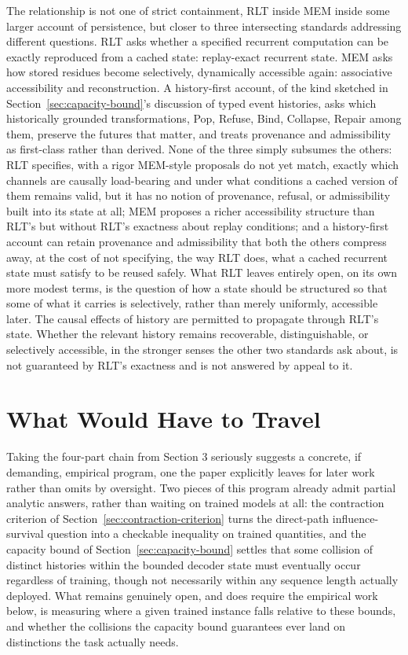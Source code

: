 \documentclass[11pt]{article}
\begin{document}
The relationship is not one of strict containment, RLT inside MEM inside some larger account of persistence, but closer to three intersecting standards addressing different questions. RLT asks whether a specified recurrent computation can be exactly reproduced from a cached state: replay-exact recurrent state. MEM asks how stored residues become selectively, dynamically accessible again: associative accessibility and reconstruction. A history-first account, of the kind sketched in Section~\ref{sec:capacity-bound}'s discussion of typed event histories, asks which historically grounded transformations, Pop, Refuse, Bind, Collapse, Repair among them, preserve the futures that matter, and treats provenance and admissibility as first-class rather than derived. None of the three simply subsumes the others: RLT specifies, with a rigor MEM-style proposals do not yet match, exactly which channels are causally load-bearing and under what conditions a cached version of them remains valid, but it has no notion of provenance, refusal, or admissibility built into its state at all; MEM proposes a richer accessibility structure than RLT's but without RLT's exactness about replay conditions; and a history-first account can retain provenance and admissibility that both the others compress away, at the cost of not specifying, the way RLT does, what a cached recurrent state must satisfy to be reused safely. What RLT leaves entirely open, on its own more modest terms, is the question of how a state should be structured so that some of what it carries is selectively, rather than merely uniformly, accessible later. The causal effects of history are permitted to propagate through RLT's state. Whether the relevant history remains recoverable, distinguishable, or selectively accessible, in the stronger senses the other two standards ask about, is not guaranteed by RLT's exactness and is not answered by appeal to it.

\section{What Would Have to Travel}

Taking the four-part chain from Section 3 seriously suggests a concrete, if demanding, empirical program, one the paper explicitly leaves for later work rather than omits by oversight. Two pieces of this program already admit partial analytic answers, rather than waiting on trained models at all: the contraction criterion of Section~\ref{sec:contraction-criterion} turns the direct-path influence-survival question into a checkable inequality on trained quantities, and the capacity bound of Section~\ref{sec:capacity-bound} settles that some collision of distinct histories within the bounded decoder state must eventually occur regardless of training, though not necessarily within any sequence length actually deployed. What remains genuinely open, and does require the empirical work below, is measuring where a given trained instance falls relative to these bounds, and whether the collisions the capacity bound guarantees ever land on distinctions the task actually needs.
\end{document}
